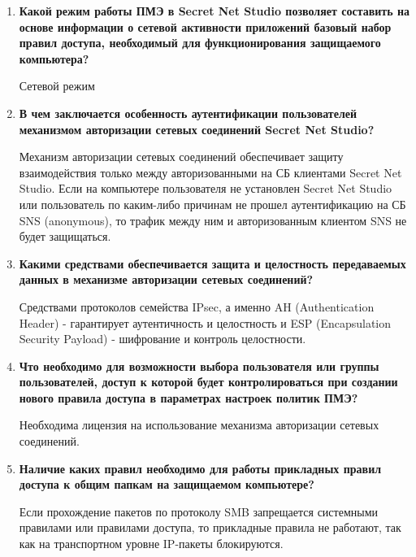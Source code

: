 \documentclass[a4paper,14pt]{extarticle}
\begin{document}
\begin{enumerate}
{        силу новые настройки правил доступа ПМЭ Secret Net Studio?}\par
        4 - 6 минут
        \item \textbf{Какой режим работы ПМЭ в Secret Net Studio позволяет составить на основе
        информации о сетевой активности приложений базовый набор \linebreak правил
        доступа, необходимый для функционирования защищаемого \linebreak компьютера?}\par
        Сетевой режим
        \item \textbf{В чем заключается особенность аутентификации пользователей механизмом
        авторизации сетевых соединений Secret Net Studio?}\par
        Механизм авторизации сетевых соединений обеспечивает защиту \linebreak взаимодействия только между авторизованными на СБ клиентами Secret Net Studio. Если на компьютере пользователя не установлен Secret Net Studio или пользователь по каким-либо причинам не прошел аутентификацию на СБ SNS (anonymous), то трафик между ним и авторизованным клиентом SNS не будет защищаться.
        \item \textbf{Какими средствами обеспечивается защита и целостность передаваемых
        данных в механизме авторизации сетевых соединений?}\par
        Средствами протоколов семейства IPsec, а именно AH (Authentication Header) - гарантирует аутентичность и целостность и ESP (Encapsulation Security Payload) - шифрование и контроль целостности.
        \item \textbf{Что необходимо для возможности выбора пользователя или группы \linebreak
        пользователей, доступ к которой будет контролироваться при создании
        нового правила доступа в параметрах настроек политик ПМЭ?}\par
        Необходима лицензия на использование механизма авторизации сетевых \linebreak соединений.
        \item \textbf{Наличие каких правил необходимо для работы прикладных правил доступа
        к общим папкам на защищаемом компьютере?}\par
        Если прохождение пакетов по протоколу SMB запрещается системными \linebreak правилами
        или правилами доступа, то прикладные правила не работают, так как на транспортном уровне IP-пакеты блокируются.
    \end{enumerate}
\end{document}
